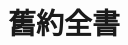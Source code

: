\part{舊約全書}

% 
% 
% 
% 
% 
% 
% 
% 
% 
% 
% 
% 
% 
% 
% 
% 
% 
% 
% 
% 
% 
% 
% 
% 
% 
% 
% 
% 
% 
% 
% 
% 
% 
% 
% 
% 
% 
% 

% 
% 
% 
% 
% 
% 
% 
% 
% 
% 
% 
% 
% 
% 
% 
% 
% 
% 
% 
% 
% 
% 
% 
% 
% 
% 
% 

